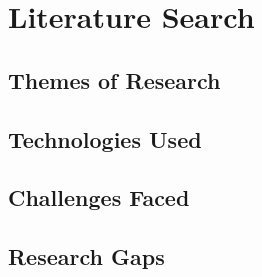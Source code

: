\chapter{Literature Search}

\section{Themes of Research}
\section{Technologies Used}
\section{Challenges Faced}
\section{Research Gaps}

